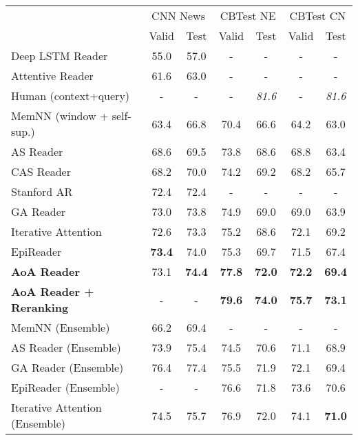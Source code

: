 \documentclass[11pt,a4paper]{article}
\begin{document}
        \begin{table*}[h]
        \begin{center}
        \begin{tabular}{lcccccc}
        \toprule
        & \multicolumn{2}{p{2cm}}{\centering CNN News} & \multicolumn{2}{p{2cm}}{\centering CBTest NE} & \multicolumn{2}{p{2cm}}{\centering CBTest CN}\\
        & Valid & Test & Valid & Test & Valid & Test\\
        \midrule
        Deep LSTM Reader \cite{hermann-etal-2015} & 55.0 & 57.0 & - & - & - & - \\
        Attentive Reader \cite{hermann-etal-2015} & 61.6 & 63.0 & - & - & - & - \\
        Human (context+query) \cite{hill-etal-2015} & - & - & - & {\em 81.6} & - & {\em 81.6} \\
        MemNN (window + self-sup.) \cite{hill-etal-2015} & 63.4\qquad & 66.8 & 70.4 & 66.6 & 64.2 & 63.0 \\ 
        AS Reader \cite{kadlec-etal-2016} & 68.6 & 69.5 & 73.8 & 68.6 & 68.8 & 63.4 \\
        CAS Reader \cite{cui-etal-2016} & 68.2 & 70.0 & 74.2 & 69.2 & 68.2 & 65.7 \\
        Stanford AR \cite{chen-etal-2016} & 72.4 & 72.4 & - & - & - & - \\
        GA Reader \cite{dhingra-etal-2016} & 73.0 & 73.8 & 74.9 & 69.0 & 69.0 & 63.9 \\
        Iterative Attention \cite{sordoni-etal-2016} & 72.6 & 73.3 & 75.2 & 68.6 & 72.1 & 69.2 \\        
        EpiReader \cite{trischler-etal-2016} & {\bf 73.4} & 74.0 & 75.3 & 69.7 & 71.5 & 67.4 \\
        \hline
        {\bf AoA Reader} & 73.1 & {\bf 74.4} & {\bf 77.8} & {\bf 72.0} & {\bf 72.2} & {\bf 69.4} \\
        {\bf AoA Reader + Reranking} & - & - & {\bf 79.6} & {\bf 74.0} & {\bf 75.7} & {\bf 73.1} \\
        \hline\hline
        MemNN (Ensemble) & 66.2 & 69.4 & - & - & - & - \\
        AS Reader (Ensemble) & 73.9 & 75.4 & 74.5 & 70.6 & 71.1 & 68.9 \\
        GA Reader (Ensemble) & 76.4 & 77.4 & 75.5 & 71.9 & 72.1 & 69.4 \\
        EpiReader (Ensemble) & - & - & 76.6 & 71.8 & 73.6 & 70.6 \\
        Iterative Attention (Ensemble) & 74.5 & 75.7 & 76.9 & 72.0 & 74.1 & {\bf 71.0} \\

\end{tabular}
\end{center}
\end{table*}
\end{document}

